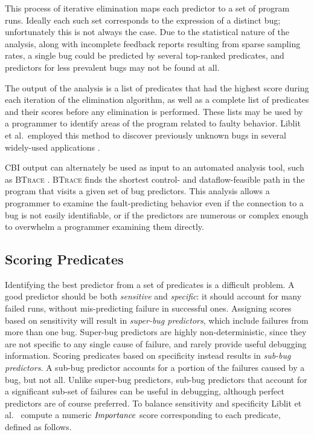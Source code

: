 This process of iterative elimination maps each predictor to a set of program runs.  Ideally each such set corresponds to the expression of a distinct bug; unfortunately this is not always the case.  Due to the statistical nature of the analysis, along with incomplete feedback reports resulting from sparse sampling rates, a single bug could be predicted by several top-ranked predicates, and predictors for less prevalent bugs may not be found at all.

The output of the analysis is a list of predicates that had the highest score during each iteration of the elimination algorithm, as well as a complete list of predicates and their scores before any elimination is performed.  These lists may be used by a programmer to identify areas of the program related to faulty behavior.  Liblit et al.\ employed this method to discover previously unknown bugs in several widely-used applications \cite{Liblit:2003:BIRPS,Liblit:2005:SSBI}.

CBI output can alternately be used as input to an automated analysis tool, such as \textsc{BTrace} \cite{Lal:2006:POPAD}. \textsc{BTrace} finds the shortest control- and dataflow-feasible path in the program that visits a given set of bug predictors.  This analysis allows a programmer to examine the fault-predicting behavior even if the connection to a bug is not easily identifiable, or if the predictors are numerous or complex enough to overwhelm a programmer examining them directly.

\subsection{Scoring Predicates}
\label{sec-scoring}
Identifying the best predictor from a set of predicates is a difficult problem.  A good predictor should be both \emph{sensitive} and \emph{specific}: it should account for many failed runs, without mis-predicting failure in successful ones.  Assigning scores based on sensitivity will result in \emph{super-bug predictors}, which include failures from more than one bug.  Super-bug predictors are highly non-deterministic, since they are not specific to any single cause of failure, and rarely provide useful debugging information.  Scoring predicates based on specificity instead results in \emph{sub-bug predictors}.  A sub-bug predictor accounts for a portion of the failures caused by a bug, but not all.  Unlike super-bug predictors, sub-bug predictors that account for a significant sub-set of failures can be useful in debugging, although perfect predictors are of course preferred.  To balance sensitivity and specificity Liblit et al.\ \cite{Liblit:2005:SSBI} compute a numeric $\mathit{Importance}$ score corresponding to each predicate, defined as follows.

